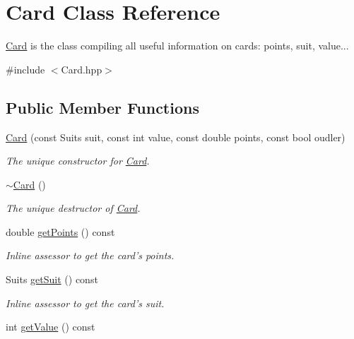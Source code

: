 \hypertarget{classCard}{\section{\-Card \-Class \-Reference}
\label{classCard}
}


\hyperlink{classCard}{\-Card} is the class compiling all useful information on cards\-: points, suit, value...  




{\ttfamily \#include $<$\-Card.\-hpp$>$}

\subsection*{\-Public \-Member \-Functions}
\begin{DoxyCompactItemize}
\item 
\hyperlink{classCard_a113a46b46e64efe0fd98a42df301db9a}{\-Card} (const \-Suits suit, const int value, const double points, const bool oudler)
\begin{DoxyCompactList}\small\item\em \-The unique constructor for \hyperlink{classCard}{\-Card}. \end{DoxyCompactList}\item 
\hypertarget{classCard_a4e05b0b68e43e5e76c6194458cee874f}{\hyperlink{classCard_a4e05b0b68e43e5e76c6194458cee874f}{$\sim$\-Card} ()}\label{classCard_a4e05b0b68e43e5e76c6194458cee874f}

\begin{DoxyCompactList}\small\item\em \-The unique destructor of \hyperlink{classCard}{\-Card}. \end{DoxyCompactList}\item 
\hypertarget{classCard_adf11e6396788e2e832d3bdf29880593f}{double \hyperlink{classCard_adf11e6396788e2e832d3bdf29880593f}{get\-Points} () const }\label{classCard_adf11e6396788e2e832d3bdf29880593f}

\begin{DoxyCompactList}\small\item\em \-Inline assessor to get the card's points. \end{DoxyCompactList}\item 
\hypertarget{classCard_a77f39ecaee335e62e267e44e07a15ebe}{\-Suits \hyperlink{classCard_a77f39ecaee335e62e267e44e07a15ebe}{get\-Suit} () const }\label{classCard_a77f39ecaee335e62e267e44e07a15ebe}

\begin{DoxyCompactList}\small\item\em \-Inline assessor to get the card's suit. \end{DoxyCompactList}\item 
\hypertarget{classCard_ab70c98dd7bfc44f87c5914990737e79d}{int \hyperlink{classCard_ab70c98dd7bfc44f87c5914990737e79d}{get\-Value} () const }\label{classCard_ab70c98dd7bfc44f87c5914990737e79d}


\end{DoxyCompactItemize}
